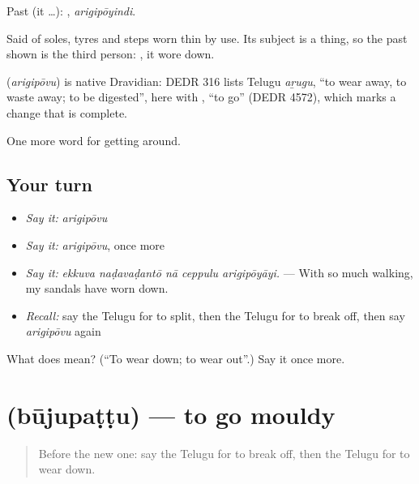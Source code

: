 Past (it …): , \emph{arigipōyindi}.

Said of soles, tyres and steps worn thin by use. Its subject is a thing, so the past shown is the third person: , it wore down.

\begin{cousinweb}
\textbf{} (\emph{arigipōvu}) is native Dravidian: DEDR 316 lists Telugu \emph{aṟugu}, \textquotedblleft{}to wear away, to waste away; to be digested\textquotedblright{}, here with , \textquotedblleft{}to go\textquotedblright{} (DEDR 4572), which marks a change that is complete.
\end{cousinweb}

\begin{grammarlens}[title={What you've built}]
One more word for getting around.
\end{grammarlens}

\subsection*{Your turn}
\begin{itemize}
\raggedright
  \item \emph{Say it:} \emph{arigipōvu}
  \item \emph{Say it:} \emph{arigipōvu}, once more
  \item \emph{Say it:} \emph{ekkuva naḍavaḍantō nā ceppulu arigipōyāyi.} — With so much walking, my sandals have worn down.
  \item \emph{Recall:} say the Telugu for to split, then the Telugu for to break off, then say \emph{arigipōvu} again
\end{itemize}

\begin{tcolorbox}[breakable,colback=teal!4,colframe=teal!35!black,title={Before you move on}]
What does  mean? (\textquotedblleft{}To wear down; to wear out\textquotedblright{}.) Say it once more.
\end{tcolorbox}
\section[\texorpdfstring{\te{బూజుపట్టు} (būjupaṭṭu)}{బూజుపట్టు (būjupaṭṭu)}]{ (būjupaṭṭu) — to go mouldy}

\label{lesson:TE-C491-bujupattu}



\begin{quote}
Before the new one: say the Telugu for to break off, then the Telugu for to wear down.
\end{quote}

